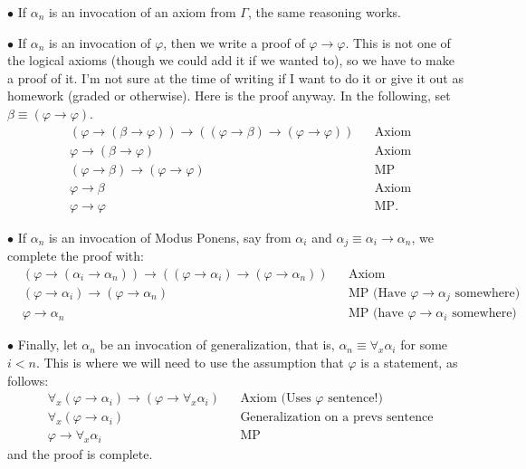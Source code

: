 \documentclass{article}
\newcommand\point[1]{\noindent \hspace{\labelsep} $\bullet$ #1 \smallskip}
\begin{document}
\point{If $\alpha_n$ is an invocation of an axiom from $\Gamma$, the same reasoning works.}

\point{If $\alpha_n$ is an invocation of $\varphi$, then we write a proof of $\varphi \rightarrow \varphi$. This is not one of the logical axioms (though we could add it if we wanted to), so we have to make a proof of it. I'm not sure at the time of writing if I want to do it or give it out as homework (graded or otherwise). Here is the proof anyway. In the following, set $\beta \equiv (\varphi \rightarrow \varphi)$.
\begin{equation}
\begin{aligned}
&(\varphi \rightarrow (\beta \rightarrow \varphi)) \rightarrow ((\varphi \rightarrow \beta) \rightarrow (\varphi \rightarrow \varphi)) && \text{Axiom}\\
&\varphi \rightarrow (\beta \rightarrow \varphi) && \text{Axiom}\\
&(\varphi \rightarrow \beta) \rightarrow (\varphi \rightarrow \varphi) && \text{MP}\\
&\varphi \rightarrow \beta && \text{Axiom}\\
&\varphi \rightarrow \varphi && \text{MP}.
\end{aligned}
\end{equation}
}

\point{If $\alpha_n$ is an invocation of Modus Ponens, say from $\alpha_i$ and $\alpha_j \equiv \alpha_i \rightarrow \alpha_n$, we complete the proof with:
\begin{equation}
\begin{aligned}
&(\varphi \rightarrow (\alpha_i \rightarrow \alpha_n)) \rightarrow ((\varphi \rightarrow \alpha_i) \rightarrow (\varphi \rightarrow \alpha_n)) && \text{Axiom}\\
&(\varphi \rightarrow \alpha_i) \rightarrow (\varphi \rightarrow \alpha_n) && \text{MP (Have $\varphi \rightarrow \alpha_j$ somewhere)}\\
&\varphi \rightarrow \alpha_n && \text{MP (have $\varphi \rightarrow \alpha_i$ somewhere)}.
\end{aligned}
\end{equation}
}

\point{Finally, let $\alpha_n$ be an invocation of generalization, that is, $\alpha_n \equiv \forall_x \alpha_i$ for some $i<n$. This is where we will need to use the assumption that $\varphi$ is a statement, as follows:
\begin{equation}
\begin{aligned}
&\forall_x (\varphi \rightarrow \alpha_i) \rightarrow (\varphi \rightarrow \forall_x \alpha_i) && \text{Axiom (Uses $\varphi$ sentence!)}\\
&\forall_x (\varphi \rightarrow \alpha_i) && \text{Generalization on a prevs sentence}\\
&\varphi \rightarrow \forall_x \alpha_i && \text{MP}
\end{aligned}
\end{equation}
and the proof is complete.
}
\end{document}
